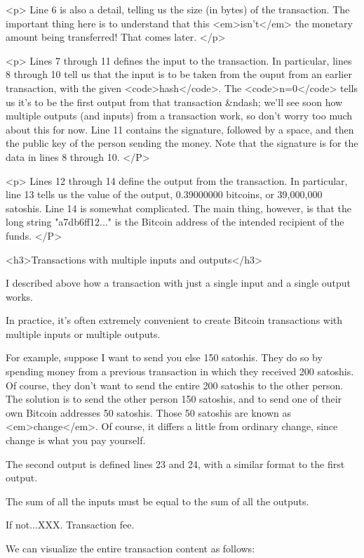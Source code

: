 <p>
Line 6 is also a detail, telling us the size (in bytes) of the
transaction.  The important thing here is to understand that this
<em>isn't</em> the monetary amount being transferred!  That comes
later.
</p>

<p>
Lines 7 through 11 defines the input to the transaction.  In
particular, lines 8 through 10 tell us that the input is to be taken
from the ouput from an earlier transaction, with the given
<code>hash</code>.  The <code>n=0</code> tells us it's to be the first
output from that transaction &ndash; we'll see soon how multiple
outputs (and inputs) from a transaction work, so don't worry too much
about this for now.  Line 11 contains the signature, followed by a
space, and then the public key of the person sending the money.  Note
that the signature is for the data in lines 8 through 10.
</P>

<p>
Lines 12 through 14 define the output from the transaction.  In
particular, line 13 tells us the value of the output, 0.39000000
bitcoins, or 39,000,000 satoshis.  Line 14 is somewhat complicated.
The main thing, however, is that the long string "a7db6ff12..." is the
Bitcoin address of the intended recipient of the funds.
</P>


<h3>Transactions with multiple inputs and outputs</h3>

I described above how a transaction with just a single input and a
single output works.

In practice, it's often extremely convenient to create Bitcoin
transactions with multiple inputs or multiple outputs.

For example, suppose I want to send you else 150 satoshis.  They do so
by spending money from a previous transaction in which they received
200 satoshis.  Of course, they don't want to send the entire 200
satoshis to the other person.  The solution is to send the other
person 150 satoshis, and to send one of their own Bitcoin addresses 50
satoshis.  Those 50 satoshis are known as <em>change</em>.  Of course,
it differs a little from ordinary change, since change is what you pay
yourself.




The second output is defined lines 23 and 24, with a similar format to
the first output.

The sum of all the inputs must be equal to the sum of all the outputs.

If not...XXX.  Transaction fee.


We can visualize the entire transaction content as follows:

